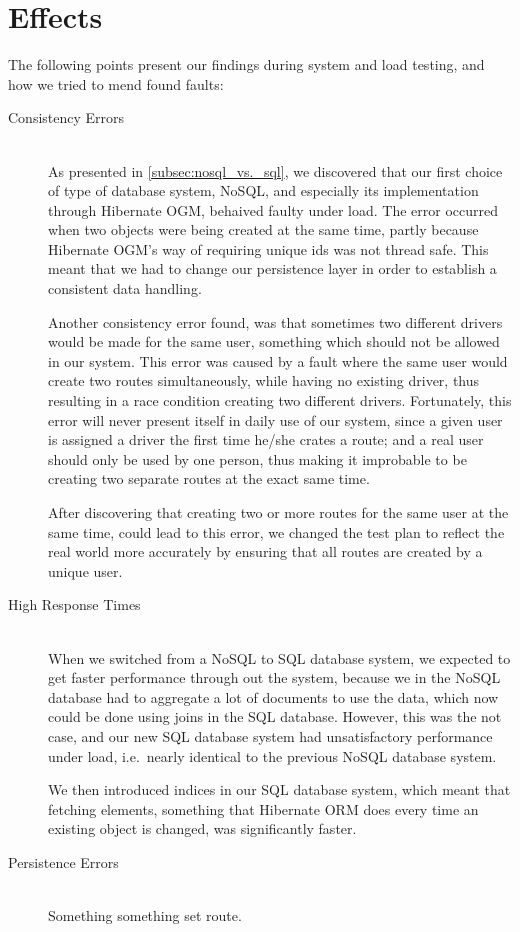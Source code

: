 \section{Effects}
The following points present our findings during system and load testing, and how we tried to mend found faults:
\begin{description}
    \item[Consistency Errors]\hfill \\
        As presented in \cref{subsec:nosql_vs._sql}, we discovered that our first choice of type of database system, NoSQL, and especially its implementation through Hibernate OGM, behaived faulty under load.
        The error occurred when two objects were being created at the same time, partly because Hibernate OGM's way of requiring unique ids was not thread safe.
        This meant that we had to change our persistence layer in order to establish a consistent data handling.

        Another consistency error found, was that sometimes two different drivers would be made for the same user, something which should not be allowed in our system.
        This error was caused by a fault where the same user would create two routes simultaneously, while having no existing driver, thus resulting in a race condition creating two different drivers.
        Fortunately, this error will never present itself in daily use of our system, since a given user is assigned a driver the first time he/she crates a route;
        and a real user should only be used by one person, thus making it improbable to be creating two separate routes at the exact same time.

        After discovering that creating two or more routes for the same user at the same time, could lead to this error, we changed the test plan to reflect the real world more accurately by ensuring that all routes are created by a unique user.
    \item[High Response Times]\hfill \\
        When we switched from a NoSQL to SQL database system, we expected to get faster performance through out the system, because we in the NoSQL database had to aggregate a lot of documents to use the data, which now could be done using joins in the SQL database.
        However, this was the not case, and our new SQL database system had unsatisfactory performance under load, i.e.~nearly identical to the previous NoSQL database system.

        We then introduced indices in our SQL database system, which meant that fetching elements, something that Hibernate ORM does every time an existing object is changed, was significantly faster.
    \item[Persistence Errors]\hfill \\
        Something something set route.
\end{description}

